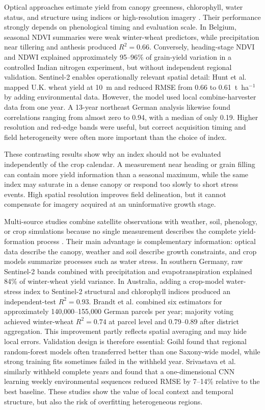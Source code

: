 Optical approaches estimate yield from canopy greenness, chlorophyll, water status, and structure using indices or high-resolution imagery \cite{vannoppen2021estimating}\cite{chandel2019yield}\cite{hunt2019high}\cite{vallentin2022suitability}. Their performance strongly depends on phenological timing and evaluation scale. In Belgium, seasonal NDVI summaries were weak winter-wheat predictors, while precipitation near tillering and anthesis produced $R^2=0.66$. Conversely, heading-stage NDVI and NDWI explained approximately 95--96\% of grain-yield variation in a controlled Indian nitrogen experiment, but without independent regional validation. Sentinel-2 enables operationally relevant spatial detail: Hunt et al. mapped U.K. wheat yield at 10~m and reduced RMSE from 0.66 to 0.61~t~ha$^{-1}$ by adding environmental data. However, the model used local combine-harvester data from one year. A 13-year northeast German analysis likewise found correlations ranging from almost zero to 0.94, with a median of only 0.19. Higher resolution and red-edge bands were useful, but correct acquisition timing and field heterogeneity were often more important than the choice of index.

These contrasting results show why an index should not be evaluated independently of the crop calendar. A measurement near heading or grain filling can contain more yield information than a seasonal maximum, while the same index may saturate in a dense canopy or respond too slowly to short stress events. High spatial resolution improves field delineation, but it cannot compensate for imagery acquired at an uninformative growth stage.

Multi-source studies combine satellite observations with weather, soil, phenology, or crop simulations because no single measurement describes the complete yield-formation process \cite{goihl2024crop}\cite{marszalek2022prediction}\cite{brandt2024ensemble}\cite{zhao2020predicting}\cite{srivastava2022winter}. Their main advantage is complementary information: optical data describe the canopy, weather and soil describe growth constraints, and crop models summarize processes such as water stress. In southern Germany, raw Sentinel-2 bands combined with precipitation and evapotranspiration explained 84\% of winter-wheat yield variance. In Australia, adding a crop-model water-stress index to Sentinel-2 structural and chlorophyll indices produced an independent-test $R^2=0.93$. Brandt et al. combined six estimators for approximately 140,000--155,000 German parcels per year; majority voting achieved winter-wheat $R^2=0.74$ at parcel level and 0.79--0.89 after district aggregation. This improvement partly reflects spatial averaging and may hide local errors. Validation design is therefore essential: Goihl found that regional random-forest models often transferred better than one Saxony-wide model, while strong training fits sometimes failed in the withheld year. Srivastava et al. similarly withheld complete years and found that a one-dimensional CNN learning weekly environmental sequences reduced RMSE by 7--14\% relative to the best baseline. These studies show the value of local context and temporal structure, but also the risk of overfitting heterogeneous regions.

